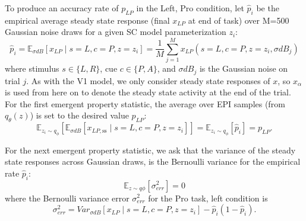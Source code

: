 \documentclass[11pt]{article}
\begin{document}
To produce an accuracy rate of $p_{LP}$ in the Left, Pro condition, let $\hat{p}_i$ be the empirical average steady state response (final $x_{LP}$ at end of task) over M=500 Gaussian noise draws for a given SC model parameterization $z_i$:
\begin{equation}
 \hat{p}_i = \mathbb{E}_{\sigma dB} \left[ x_{LP} \mid s=L, c=P, z=z_i \right] = \frac{1}{M}\sum_{j=1}^M x_{LP}(s=L, c=P, z=z_i, \sigma dB_j)
 \end{equation}
 where stimulus $s \in \{L, R\}$, cue $c \in \{P, A\}$, and $\sigma dB_j$ is the Gaussian noise on trial $j$.
As with the V1 model, we only consider steady state responses of $x$, so $x_\alpha$ is used from here on to denote the steady state activity at the end of the trial.
For the first emergent property statistic, the average over EPI samples (from $q_\theta(z)$) is set to the desired value $p_{LP}$:
\begin{equation}
\mathbb{E}_{z_i \sim q_\phi} \left[ \mathbb{E}_{\sigma dB} \left[ x_{LP,\text{ss}} \mid s=L, c=P, z=z_i \right] \right] = \mathbb{E}_{z_i \sim q_\phi} \left[ \hat{p}_i \right] = p_{LP}.
\end{equation}

For the next emergent property statistic, we ask that the variance of the steady state responses across Gaussian draws, is the Bernoulli variance for the empirical rate $\hat{p}_i$:
\begin{equation}
\mathbb{E}_{z \sim q\phi} \left[ \sigma^2_{err} \right] = 0
\end{equation}
where the Bernoulli variance error $\sigma^2_{err}$ for the Pro task, left condition is
\begin{equation}
\sigma^2_{err} = Var_{\sigma dB} \left[ x_{LP} \mid s=L, c=P, z=z_i \right] - \hat{p}_i(1 - \hat{p}_i).
\end{equation}
\end{document}

